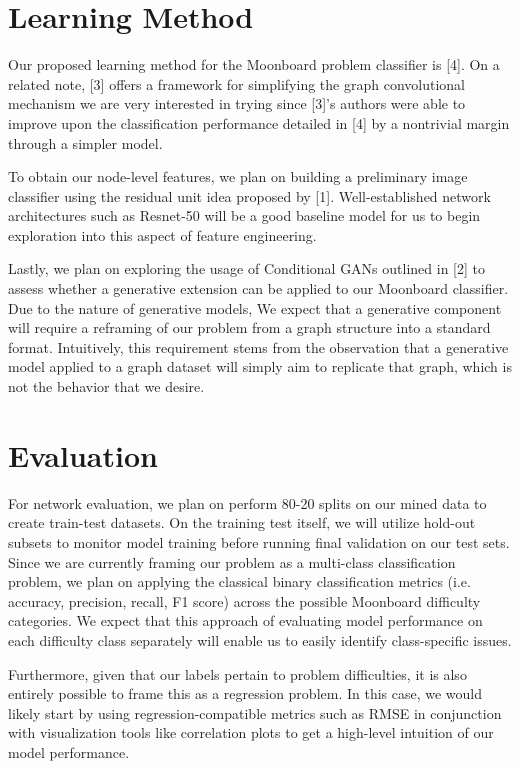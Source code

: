 \documentclass{article}
\begin{document}
\section{Learning Method}
Our proposed learning method for the Moonboard problem classifier is [4]. On a related note, [3] offers a framework for simplifying the graph convolutional mechanism we are very interested in trying since [3]'s authors were able to improve upon the classification performance detailed in [4] by a nontrivial margin through a simpler model. 

To obtain our node-level features, we plan on building a preliminary image classifier using the residual unit idea proposed by [1]. Well-established network architectures such as Resnet-50 will be a good baseline model for us to begin exploration into this aspect of feature engineering. 

Lastly, we plan on exploring the usage of Conditional GANs outlined in [2] to assess whether a generative extension can be applied to our Moonboard classifier. Due to the nature of generative models, We expect that a generative component will require a reframing of our problem from a graph structure into a standard format. Intuitively, this requirement stems from the observation that a generative model applied to a graph dataset will simply aim to replicate that graph, which is not the behavior that we desire. 

\section{Evaluation}
For network evaluation, we plan on perform 80-20 splits on our mined data to create train-test datasets. On the training test itself, we will utilize hold-out subsets to monitor model training before running final validation on our test sets. Since we are currently framing our problem as a multi-class classification problem, we plan on applying the classical binary classification metrics (i.e. accuracy, precision, recall, F1 score) across the possible Moonboard difficulty categories. We expect that this approach of evaluating model performance on each difficulty class separately will enable us to easily identify class-specific issues.

Furthermore, given that our labels pertain to problem difficulties, it is also entirely possible to frame this as a regression problem. In this case, we would likely start by using regression-compatible metrics such as RMSE in conjunction with visualization tools like correlation plots to get a high-level intuition of our model performance. 
\end{document}
